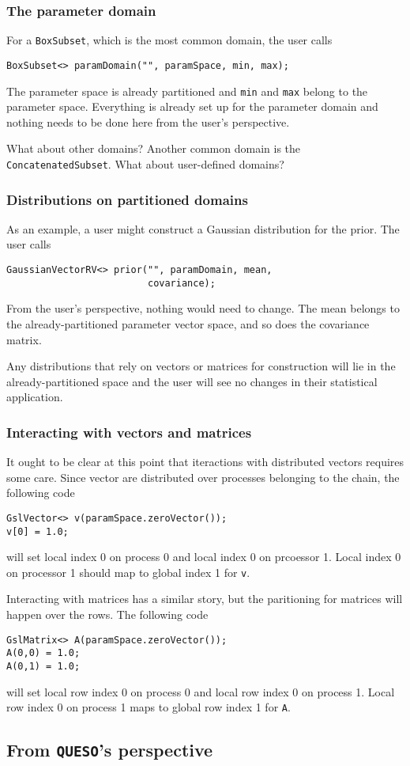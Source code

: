 \documentclass{article}
\newcommand{\Queso}{\texttt{QUESO}}
\begin{document}
\subsubsection{The parameter domain}

For a \lstinline|BoxSubset|, which is the most common domain, the user calls
\begin{lstlisting}
BoxSubset<> paramDomain("", paramSpace, min, max);
\end{lstlisting}
The parameter space is already partitioned and \lstinline|min| and
\lstinline|max| belong to the parameter space.  Everything is already set up
for the parameter domain and nothing needs to be done here from the user's
perspective.

What about other domains?  Another common domain is the
\lstinline|ConcatenatedSubset|.  What about user-defined domains?

\subsubsection{Distributions on partitioned domains}

As an example, a user might construct a Gaussian distribution for the prior.
The user calls
\begin{lstlisting}
GaussianVectorRV<> prior("", paramDomain, mean,
                         covariance);
\end{lstlisting}
From the user's perspective, nothing would need to change.  The mean belongs
to the already-partitioned parameter vector space, and so does the covariance
matrix.

Any distributions that rely on vectors or matrices for construction will lie
in the already-partitioned space and the user will see no changes in their
statistical application.

\subsubsection{Interacting with vectors and matrices}

It ought to be clear at this point that iteractions with distributed vectors
requires some care.  Since vector are distributed over processes belonging to
the chain, the following code
\begin{lstlisting}
GslVector<> v(paramSpace.zeroVector());
v[0] = 1.0;
\end{lstlisting}
will set local index 0 on process 0 and local index 0 on prcoessor 1.  Local
index 0 on processor 1 should map to global index 1 for \lstinline|v|.

Interacting with matrices has a similar story, but the paritioning for matrices
will happen over the rows.  The following code
\begin{lstlisting}
GslMatrix<> A(paramSpace.zeroVector());
A(0,0) = 1.0;
A(0,1) = 1.0;
\end{lstlisting}
will set local row index 0 on process 0 and local row index 0 on process 1.
Local row index 0 on process 1 maps to global row index 1 for \lstinline|A|.

\subsection{From \Queso's perspective}
\end{document}
